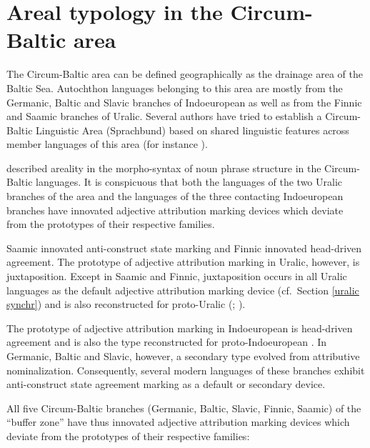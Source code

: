 
\chapter{Areal typology in the Circum-Baltic area}\label{circumbaltic}
The Circum-Baltic area can be defined geographically as the drainage area of the Baltic Sea. Autochthon languages belonging to this area are mostly from the Germanic, Baltic and Slavic branches of Indoeuropean as well as from the Finnic and Saamic branches of Uralic. Several authors have tried to establish a Circum-Baltic Linguistic Area (Sprachbund) based on shared linguistic features across member languages of this area (for instance \citealt{koptjevskaja-tamm2006}).

\cite{riesler2006a} described areality in the morpho-syntax of noun phrase structure in the Circum-Baltic languages. It is conspicuous that both the languages of the two Uralic branches of the area and the languages of the three contacting Indoeuropean branches have innovated adjective attribution marking devices which deviate from the prototypes of their respective families.

Saamic innovated anti-construct state marking and Finnic innovated head-driven agreement. The prototype of adjective attribution marking in Uralic, however, is juxtaposition. Except in Saamic and Finnic, juxtaposition occurs in all Uralic languages as the default adjective attribution marking device (cf.~Section \ref{uralic synchr}) and is also reconstructed for proto-Uralic (\citealt[66, 81]{decsy1990}; \citealt[32]{janhunen1981}).

The prototype of adjective attribution marking in Indoeuropean is head-driven agreement and is also the type reconstructed for proto-Indoeuropean \citep{decsy1991,watkins1998}. In Germanic, Baltic and Slavic, however, a secondary type evolved from attributive nominalization. Consequently, several modern languages of these branches exhibit anti-construct state agreement marking as a default or secondary device.

All five Circum-Baltic branches (Germanic, Baltic, Slavic, Finnic, Saamic) of the “buffer zone” have thus innovated adjective attribution marking devices which deviate from the prototypes of their respective families:


